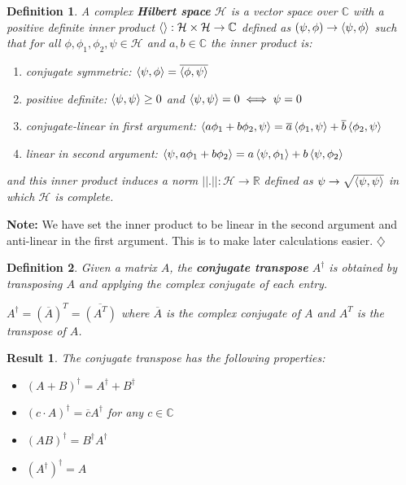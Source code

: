 \documentclass[12pt,twoside,fleqn]{report}
\theoremstyle{thmstyle}
\newtheorem{defn}{Definition}[chapter]
\newtheorem{result}{Result}[chapter]
\newenvironment{note}{\textbf{Note:}}{\hfill\ensuremath{\diamondsuit}}
\begin{document}
\begin{samepage}
\begin{defn}
    A complex \textbf{Hilbert space} $\mathcal{H}$ is a vector space over $\mathbb{C}$ with a positive definite inner product $\braket{} : \mathcal{H} \times \mathcal{H} \to \mathbb{C}$ defined as $(\psi,\phi) \to \braket{\psi,\phi}$ such that for all $\phi, \phi_1, \phi_2, \psi \in \mathcal{H}$ and $a, b \in \mathbb{C}$ the inner product is:
    \begin{enumerate}
        \item conjugate symmetric: $\braket{\psi,\phi} = \overline{\braket{\phi,\psi}}$
        \item positive definite: $\braket{\psi, \psi} \geq 0$ and $\braket{\psi, \psi} = 0 \iff \psi = 0$
        \item conjugate-linear in first argument: $\braket{a \phi_1 + b \phi_2, \psi} = \overline{a} \braket{\phi_1, \psi} + \overline{b} \braket{\phi_2, \psi}$
        \item linear in second argument: $\braket{\psi, a \phi_1 + b \phi_2} = a \braket{\psi,\phi_1} + b \braket{\psi,\phi_2}$
    \end{enumerate}
    and this inner product induces a norm $||.|| : \mathcal{H} \to \mathbb{R}$ defined as $\psi \to \sqrt{\braket{\psi,\psi}}$ in which $\mathcal{H}$ is complete.
\end{defn}

\begin{note}
    We have set the inner product to be linear in the second argument and anti-linear in the first argument. This is to make later calculations easier.
\end{note}
\end{samepage}

\begin{defn}
    Given a matrix $A$, the \textbf{conjugate transpose} $A^\dagger$ is obtained by transposing $A$ and applying the complex conjugate of each entry.

    $A^\dagger = (\overline{A})^T = \overline{(A^T)}$ where $\overline{A}$ is the complex conjugate of $A$ and $A^T$ is the transpose of $A$.
\end{defn}

\begin{result}
    The conjugate transpose has the following properties:
    \begin{itemize}
        \item $(A + B)^\dagger = A^\dagger + B^\dagger$
        \item $(c \cdot A)^\dagger = \overline{c} A^\dagger$ for any $c \in \mathbb{C}$
        \item $(AB)^\dagger = B^\dagger A^\dagger$
        \item $(A^\dagger)^\dagger = A$
    \end{itemize}
\end{result}
\end{document}

